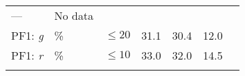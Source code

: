 \documentclass[DM, lsstdraft, toc]{lsstdoc}
\begin{document}
\begin{longtable}[]{@{}lllllll@{}}
\begin{minipage}[t]{0.12\columnwidth}
---\strut
\end{minipage} & \begin{minipage}[t]{0.17\columnwidth}\raggedright\strut
No data\strut
\end{minipage}\tabularnewline
\begin{minipage}[t]{0.12\columnwidth}\raggedright\strut
PF1: \emph{g}\strut
\end{minipage} & \begin{minipage}[t]{0.06\columnwidth}\raggedright\strut
\%\strut
\end{minipage} & \begin{minipage}[t]{0.14\columnwidth}\raggedright\strut
\(\leq 20\)\strut
\end{minipage} & \begin{minipage}[t]{0.12\columnwidth}\raggedright\strut
31.1\strut
\end{minipage} & \begin{minipage}[t]{0.12\columnwidth}\raggedright\strut
30.4\strut
\end{minipage} & \begin{minipage}[t]{0.12\columnwidth}\raggedright\strut
12.0\strut
\end{minipage} & \begin{minipage}[t]{0.17\columnwidth}\raggedright\strut
\strut
\end{minipage}\tabularnewline
\begin{minipage}[t]{0.12\columnwidth}\raggedright\strut
PF1: \emph{r}\strut
\end{minipage} & \begin{minipage}[t]{0.06\columnwidth}\raggedright\strut
\%\strut
\end{minipage} & \begin{minipage}[t]{0.14\columnwidth}\raggedright\strut
\(\leq 10\)\strut
\end{minipage} & \begin{minipage}[t]{0.12\columnwidth}\raggedright\strut
33.0\strut
\end{minipage} & \begin{minipage}[t]{0.12\columnwidth}\raggedright\strut
32.0\strut
\end{minipage} & \begin{minipage}[t]{0.12\columnwidth}\raggedright\strut
14.5\strut
\end{minipage} & \begin{minipage}[t]{0.17\columnwidth}\raggedright\strut
\strut
\end{minipage}\tabularnewline
\begin{minipage}[t]{0.12\columnwidth}\raggedright\strut

\end{minipage}
\end{longtable}
\end{document}
